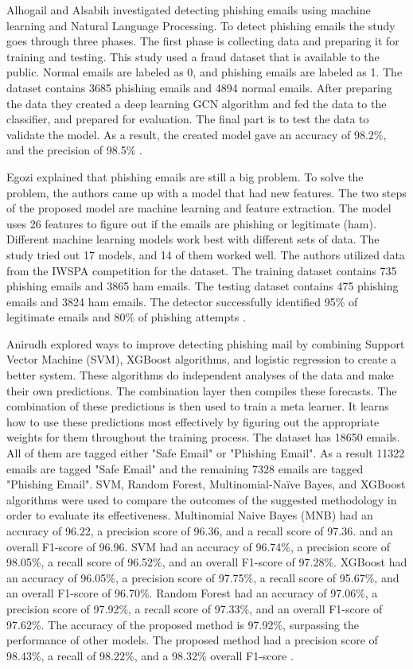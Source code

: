 \documentclass[conference]{IEEEtran}
\begin{document}
Alhogail and  Alsabih investigated detecting phishing emails using machine learning and Natural Language Processing. To detect phishing emails the study goes through three phases. The first phase is collecting data and preparing it for training and testing. This study used a fraud dataset that is available to the public. Normal emails are labeled as 0, and phishing emails are labeled as 1. The dataset contains 3685 phishing emails and 4894 normal emails. After preparing the data they created a deep learning GCN algorithm and fed the data to the classifier, and prepared for evaluation. The final part is to test the data to validate the model. As a result, the created model gave an accuracy of 98.2\%, and the precision of 98.5\% \cite{alhogail2021applying}.


Egozi explained that phishing emails are still a big problem. To solve the problem, the authors came up with a model that had new features. The two steps of the proposed model are machine learning and feature extraction. The model uses 26 features to figure out if the emails are phishing or legitimate (ham). Different machine learning models work best with different sets of data. The study tried out 17 models, and 14 of them worked well. The authors utilized data from the IWSPA competition for the dataset. The training dataset contains 735 phishing emails and 3865 ham emails. The testing dataset contains 475 phishing emails and 3824 ham emails. The detector successfully identified 95\% of legitimate emails and 80\% of phishing attempts \cite{egozi2018phishing}.


Anirudh explored ways to improve detecting phishing mail by combining Support Vector Machine (SVM), XGBoost algorithms, and logistic regression to create a better system. These algorithms do independent analyses of the data and make their own predictions. The combination layer then compiles these forecasts. The combination of these predictions is then used to train a meta learner. It learns how to use these predictions most effectively by figuring out the appropriate weights for them throughout the training process. The dataset has 18650 emails. All of them are tagged either "Safe Email" or "Phishing Email". As a result 11322 emails are tagged "Safe Email" and the remaining 7328 emails are tagged "Phishing Email". SVM, Random Forest, Multinomial-Naïve Bayes, and XGBoost algorithms were used to compare the outcomes of the suggested methodology in order to evaluate its effectiveness. Multinomial Naive Bayes (MNB) had an accuracy of 96.22, a precision score of 96.36, and a recall score of 97.36.  and an overall F1-score of 96.96. SVM had an accuracy of 96.74\%, a precision score of 98.05\%, a recall score of 96.52\%, and an overall F1-score of 97.28\%. XGBoost had an accuracy of 96.05\%, a precision score of 97.75\%, a recall score of 95.67\%, and an overall F1-score of 96.70\%. Random Forest had an accuracy of 97.06\%, a precision score of 97.92\%, a recall score of 97.33\%, and an overall F1-score of 97.62\%. The accuracy of the proposed method is 97.92\%, surpassing the performance of other models. The proposed method had a precision score of 98.43\%, a recall of 98.22\%, and a 98.32\% overall F1-score \cite{anirudh2024ensemble}.
\end{document}
